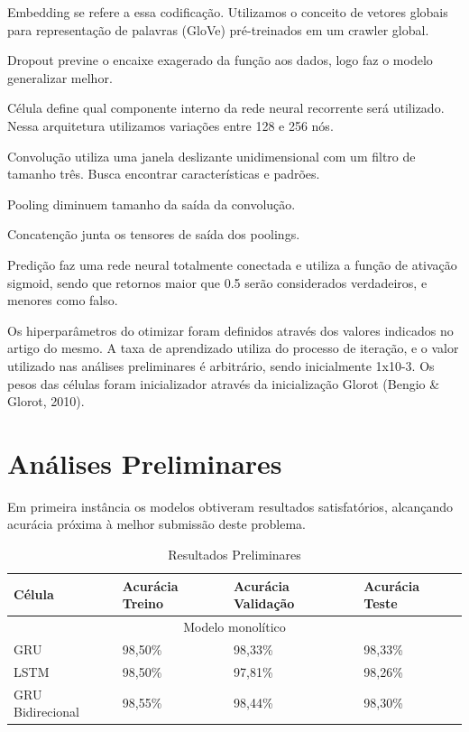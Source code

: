\documentclass[12pt]{article}
\begin{document}
Embedding se refere a essa codificação. Utilizamos o conceito de vetores globais para representação de palavras (GloVe) pré-treinados em um crawler global.

Dropout previne o encaixe exagerado da função aos dados, logo faz o modelo generalizar melhor.

Célula define qual componente interno da rede neural recorrente será utilizado. Nessa arquitetura utilizamos variações entre 128 e 256 nós.

Convolução utiliza uma janela deslizante unidimensional com um filtro de tamanho três. Busca encontrar características e padrões.

Pooling diminuem tamanho da saída da convolução.

Concatenção junta os tensores de saída dos poolings.

Predição faz uma rede neural totalmente conectada e utiliza a função de ativação sigmoid, sendo que retornos maior que 0.5 serão considerados verdadeiros, e menores como falso.

Os hiperparâmetros do otimizar foram definidos através dos valores indicados no artigo do mesmo. A taxa de aprendizado utiliza do processo de iteração, e o valor utilizado nas análises preliminares é arbitrário, sendo inicialmente 1x10-3. Os pesos das células foram inicializador através da inicialização Glorot (Bengio & Glorot, 2010).

\section{Análises Preliminares}

Em primeira instância os modelos obtiveram resultados satisfatórios, alcançando acurácia próxima à melhor submissão deste problema.

\begin{table}[t]
  \small
  \centering
  \renewcommand{\arraystretch}{1.15}
  \begin{tabular}{llll}
    \hline
     Célula & Acurácia Treino & Acurácia Validação & Acurácia Teste \\
    \hline
    \multicolumn{4}{c}{Modelo monolítico} \\
    \hline
    GRU & 98,50\% & 98,33\% & 98,33\% \\
    LSTM & 98,50\% & 97,81\% & 98,26\% \\
    GRU Bidirecional & 98,55\% & 98,44\% & 98,30\% \\
    \hline
  \end{tabular}
  \caption{Resultados Preliminares}
  \label{tab:ptb}
\end{table}
\end{document}
